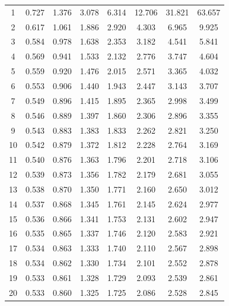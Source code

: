 \begin{center}
\begin{minipage}[t]{0.49\textwidth}
\begin{tabular}{
				|c
				!{\color{black!85}\vrule width 1.8pt}
				c|c|c|c|c|c|c|
			}
			1  & 0.727 & 1.376 & 3.078 & 6.314 & 12.706 & 31.821 & 63.657\\
			2  & 0.617 & 1.061 & 1.886 & 2.920 & 4.303  & 6.965  & 9.925\\
			3  & 0.584 & 0.978 & 1.638 & 2.353 & 3.182  & 4.541  & 5.841\\
			4  & 0.569 & 0.941 & 1.533 & 2.132 & 2.776  & 3.747  & 4.604\\
			5  & 0.559 & 0.920 & 1.476 & 2.015 & 2.571  & 3.365  & 4.032\\
			6  & 0.553 & 0.906 & 1.440 & 1.943 & 2.447  & 3.143  & 3.707\\
			7  & 0.549 & 0.896 & 1.415 & 1.895 & 2.365  & 2.998  & 3.499\\
			8  & 0.546 & 0.889 & 1.397 & 1.860 & 2.306  & 2.896  & 3.355\\
			9  & 0.543 & 0.883 & 1.383 & 1.833 & 2.262  & 2.821  & 3.250\\
			10 & 0.542 & 0.879 & 1.372 & 1.812 & 2.228  & 2.764  & 3.169\\
			11 & 0.540 & 0.876 & 1.363 & 1.796 & 2.201  & 2.718  & 3.106\\
			12 & 0.539 & 0.873 & 1.356 & 1.782 & 2.179  & 2.681  & 3.055\\
			13 & 0.538 & 0.870 & 1.350 & 1.771 & 2.160  & 2.650  & 3.012\\
			14 & 0.537 & 0.868 & 1.345 & 1.761 & 2.145  & 2.624  & 2.977\\
			15 & 0.536 & 0.866 & 1.341 & 1.753 & 2.131  & 2.602  & 2.947\\
			16 & 0.535 & 0.865 & 1.337 & 1.746 & 2.120  & 2.583  & 2.921\\
			17 & 0.534 & 0.863 & 1.333 & 1.740 & 2.110  & 2.567  & 2.898\\
			18 & 0.534 & 0.862 & 1.330 & 1.734 & 2.101  & 2.552  & 2.878\\
			19 & 0.533 & 0.861 & 1.328 & 1.729 & 2.093  & 2.539  & 2.861\\
			20 & 0.533 & 0.860 & 1.325 & 1.725 & 2.086  & 2.528  & 2.845\\
			
			\hline
		\end{tabular}
	\end{minipage}
	\hfill
	\begin{minipage}[t]{0.49\textwidth}
		\centering
		
		\begin{tabular}{
				|c
				!{\color{black!85}\vrule width 1.8pt}
				c|c|c|c|c|c|c|
			}
			\hline
			

\end{tabular}
\end{minipage}
\end{center}

